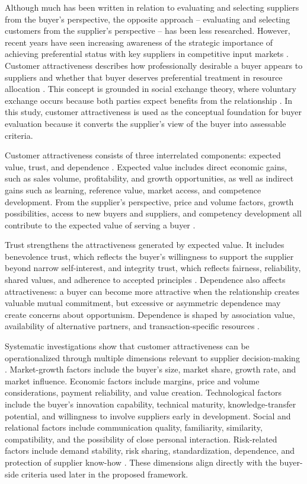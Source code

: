 \documentclass[11pt]{article}
\begin{document}
Although much has been written in relation to evaluating and selecting suppliers from the buyer's perspective, the opposite approach -- evaluating and selecting customers from the supplier's perspective -- has been less researched. However, recent years have seen increasing awareness of the strategic importance of achieving preferential status with key suppliers in competitive input markets \cite{ref32}. Customer attractiveness describes how professionally desirable a buyer appears to suppliers and whether that buyer deserves preferential treatment in resource allocation \cite{ref32,ref33}. This concept is grounded in social exchange theory, where voluntary exchange occurs because both parties expect benefits from the relationship \cite{ref33,ref34}. In this study, customer attractiveness is used as the conceptual foundation for buyer evaluation because it converts the supplier's view of the buyer into assessable criteria.



Customer attractiveness consists of three interrelated components: expected value, trust, and dependence \cite{ref33}. Expected value includes direct economic gains, such as sales volume, profitability, and growth opportunities, as well as indirect gains such as learning, reference value, market access, and competence development. From the supplier's perspective, price and volume factors, growth possibilities, access to new buyers and suppliers, and competency development all contribute to the expected value of serving a buyer \cite{ref33}.

Trust strengthens the attractiveness generated by expected value. It includes benevolence trust, which reflects the buyer's willingness to support the supplier beyond narrow self-interest, and integrity trust, which reflects fairness, reliability, shared values, and adherence to accepted principles \cite{ref33}. Dependence also affects attractiveness: a buyer can become more attractive when the relationship creates valuable mutual commitment, but excessive or asymmetric dependence may create concerns about opportunism. Dependence is shaped by association value, availability of alternative partners, and transaction-specific resources \cite{ref33}.



Systematic investigations show that customer attractiveness can be operationalized through multiple dimensions relevant to supplier decision-making \cite{ref32}. Market-growth factors include the buyer's size, market share, growth rate, and market influence. Economic factors include margins, price and volume considerations, payment reliability, and value creation. Technological factors include the buyer's innovation capability, technical maturity, knowledge-transfer potential, and willingness to involve suppliers early in development. Social and relational factors include communication quality, familiarity, similarity, compatibility, and the possibility of close personal interaction. Risk-related factors include demand stability, risk sharing, standardization, dependence, and protection of supplier know-how \cite{ref32}. These dimensions align directly with the buyer-side criteria used later in the proposed framework.
\end{document}
